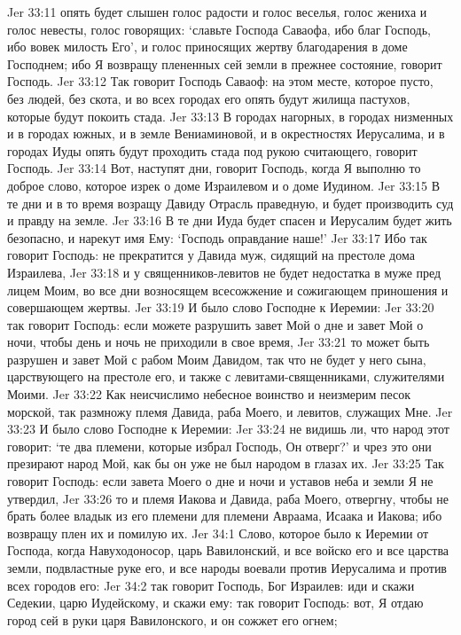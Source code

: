 Jer 33:11  опять будет слышен голос радости и голос веселья, голос жениха и голос невесты, голос говорящих: `славьте Господа Саваофа, ибо благ Господь, ибо вовек милость Его', и голос приносящих жертву благодарения в доме Господнем; ибо Я возвращу плененных сей земли в прежнее состояние, говорит Господь.
Jer 33:12  Так говорит Господь Саваоф: на этом месте, которое пусто, без людей, без скота, и во всех городах его опять будут жилища пастухов, которые будут покоить стада.
Jer 33:13  В городах нагорных, в городах низменных и в городах южных, и в земле Вениаминовой, и в окрестностях Иерусалима, и в городах Иуды опять будут проходить стада под рукою считающего, говорит Господь.
Jer 33:14  Вот, наступят дни, говорит Господь, когда Я выполню то доброе слово, которое изрек о доме Израилевом и о доме Иудином.
Jer 33:15  В те дни и в то время возращу Давиду Отрасль праведную, и будет производить суд и правду на земле.
Jer 33:16  В те дни Иуда будет спасен и Иерусалим будет жить безопасно, и нарекут имя Ему: `Господь оправдание наше!'
Jer 33:17  Ибо так говорит Господь: не прекратится у Давида муж, сидящий на престоле дома Израилева,
Jer 33:18  и у священников-левитов не будет недостатка в муже пред лицем Моим, во все дни возносящем всесожжение и сожигающем приношения и совершающем жертвы.
Jer 33:19  И было слово Господне к Иеремии:
Jer 33:20  так говорит Господь: если можете разрушить завет Мой о дне и завет Мой о ночи, чтобы день и ночь не приходили в свое время,
Jer 33:21  то может быть разрушен и завет Мой с рабом Моим Давидом, так что не будет у него сына, царствующего на престоле его, и также с левитами-священниками, служителями Моими.
Jer 33:22  Как неисчислимо небесное воинство и неизмерим песок морской, так размножу племя Давида, раба Моего, и левитов, служащих Мне.
Jer 33:23  И было слово Господне к Иеремии:
Jer 33:24  не видишь ли, что народ этот говорит: `те два племени, которые избрал Господь, Он отверг?' и чрез это они презирают народ Мой, как бы он уже не был народом в глазах их.
Jer 33:25  Так говорит Господь: если завета Моего о дне и ночи и уставов неба и земли Я не утвердил,
Jer 33:26  то и племя Иакова и Давида, раба Моего, отвергну, чтобы не брать более владык из его племени для племени Авраама, Исаака и Иакова; ибо возвращу плен их и помилую их.
Jer 34:1  Слово, которое было к Иеремии от Господа, когда Навуходоносор, царь Вавилонский, и все войско его и все царства земли, подвластные руке его, и все народы воевали против Иерусалима и против всех городов его:
Jer 34:2  так говорит Господь, Бог Израилев: иди и скажи Седекии, царю Иудейскому, и скажи ему: так говорит Господь: вот, Я отдаю город сей в руки царя Вавилонского, и он сожжет его огнем;
